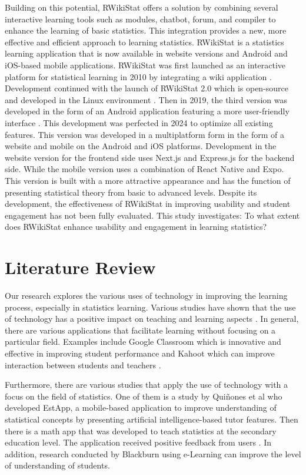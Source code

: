 \documentclass[conference,a4paper]{IEEEtran}
\begin{document}
Building on this potential, RWikiStat offers a solution by combining several interactive learning tools such as modules, chatbot, forum, and compiler to enhance the learning of basic statistics. This integration provides a new, more effective and efficient approach to learning statistics. RWikiStat is a statistics learning application that is now available in website versions and Android and iOS-based mobile applications. RWikiStat was first launched as an interactive platform for statistical learning in 2010 by integrating a wiki application \cite{b6}. Development continued with the launch of RWikiStat 2.0 which is open-source and developed in the Linux environment \cite{b7}. Then in 2019, the third version was developed in the form of an Android application featuring a more user-friendly interface \cite{b8}. This development was perfected in 2024 to optimize all existing features. This version was developed in a multiplatform form in the form of a website and mobile on the Android and iOS platforms. Development in the website version for the frontend side uses Next.js and Express.js for the backend side. While the mobile version uses a combination of React Native and Expo. This version is built with a more attractive appearance and has the function of presenting statistical theory from basic to advanced levels. Despite its development, the effectiveness of RWikiStat in improving usability and student engagement has not been fully evaluated. This study investigates: To what extent does RWikiStat enhance usability and engagement in learning statistics?


\section{Literature Review}
\label{sect:literature_review}
Our research explores the various uses of technology in improving the learning process, especially in statistics learning. Various studies have shown that the use of technology has a positive impact on teaching and learning aspects \cite{b9}\cite{b10}\cite{b11}. In general, there are various applications that facilitate learning without focusing on a particular field. Examples include Google Classroom which is innovative and effective in improving student performance \cite{b12} and Kahoot which can improve interaction between students and teachers \cite{b13}.

Furthermore, there are various studies that apply the use of technology with a focus on the field of statistics. One of them is a study by Quiñones et al \cite{b14} who developed EstApp, a mobile-based application to improve understanding of statistical concepts by presenting artificial intelligence-based tutor features. Then there is a math app that was developed to teach statistics at the secondary education level. The application received positive feedback from users \cite{b3}. In addition, research conducted by Blackburn \cite{b15} using e-Learning can improve the level of understanding of students.
\end{document}
